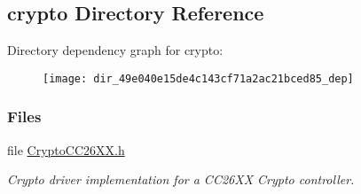 \subsection{crypto Directory Reference}
\label{dir_49e040e15de4c143cf71a2ac21bced85}
Directory dependency graph for crypto\-:
\nopagebreak
\begin{figure}[H]
\begin{center}
\leavevmode
\texttt{[image: dir\_49e040e15de4c143cf71a2ac21bced85\_dep]}
\end{center}
\end{figure}
\subsubsection*{Files}
\begin{DoxyCompactItemize}
\item 
file \hyperlink{_crypto_c_c26_x_x_8h}{Crypto\-C\-C26\-X\-X.\-h}
\begin{DoxyCompactList}\small\item\em Crypto driver implementation for a C\-C26\-X\-X Crypto controller. \end{DoxyCompactList}\end{DoxyCompactItemize}
